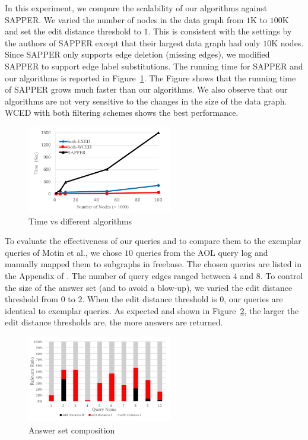 \documentclass{sigmod}
\begin{document}
In this experiment, we compare the scalability of our algorithms against SAPPER. We varied the number of nodes in the data graph from $1$K to $100$K and set the edit distance threshold to $1$. This is consistent with the settings by the authors of SAPPER except that their largest data graph had only $10$K nodes. 
Since SAPPER only supports edge deletion (missing edges), we modified SAPPER to support edge label substitutions. The running time for SAPPER and our algorithms is reported in Figure~\ref{fig:comp}. The Figure shows that the running time of SAPPER grows much faster than our algorithms. We also observe that our algorithms are not very sensitive to the changes in the size of the data graph. WCED with both filtering schemes shows the best performance. 
\begin{figure}[htbp] 
\setlength{\abovecaptionskip}{-0.5\baselineskip}
\setlength{\belowcaptionskip}{-0.5\baselineskip}
\centering\includegraphics[width=2.5in]{comp.pdf} 
\caption{Time vs different algorithms}
\label{fig:comp}
\end{figure}

To evaluate the effectiveness of our queries and to compare them to the exemplar queries of Motin et al.\cite{mottin2014exemplar}, we chose $10$ queries from the AOL query log and manually mapped them to subgraphs in freebase. The chosen queries are listed in the Appendix of \cite{eteq2016}. The number of query edges ranged between $4$ and $8$. To control the size of the answer set (and to avoid a blow-up), we varied the edit distance threshold from $0$ to $2$. When the edit distance threshold is $0$, our queries are identical to exemplar queries. As expected and shown in Figure~\ref{fig:exqcomp}, the larger the edit distance thresholds are, the more answers are returned.
\begin{figure}[htbp] 
\setlength{\abovecaptionskip}{-0.5\baselineskip}
\setlength{\belowcaptionskip}{-0.5\baselineskip}
\centering\includegraphics[width=2.5in]{exqcomp.pdf} 
\caption{Answer set composition}
\label{fig:exqcomp}
\end{figure}
\end{document}
